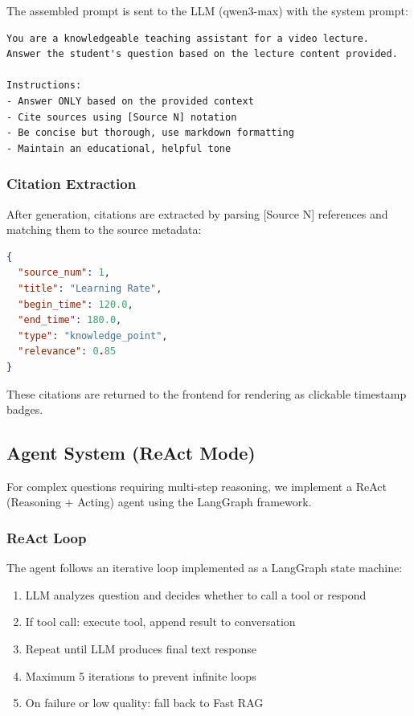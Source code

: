 The assembled prompt is sent to the LLM (qwen3-max) with the system prompt:

\begin{lstlisting}[language=text, caption={RAG System Prompt}]
You are a knowledgeable teaching assistant for a video lecture.
Answer the student's question based on the lecture content provided.

Instructions:
- Answer ONLY based on the provided context
- Cite sources using [Source N] notation
- Be concise but thorough, use markdown formatting
- Maintain an educational, helpful tone
\end{lstlisting}

\subsubsection{Citation Extraction}

After generation, citations are extracted by parsing [Source N] references and matching them to the source metadata:

\begin{lstlisting}[language=json, caption={Citation Structure}]
{
  "source_num": 1,
  "title": "Learning Rate",
  "begin_time": 120.0,
  "end_time": 180.0,
  "type": "knowledge_point",
  "relevance": 0.85
}
\end{lstlisting}

These citations are returned to the frontend for rendering as clickable timestamp badges.

\subsection{Agent System (ReAct Mode)}

For complex questions requiring multi-step reasoning, we implement a ReAct (Reasoning + Acting) agent using the LangGraph framework.

\subsubsection{ReAct Loop}

The agent follows an iterative loop implemented as a LangGraph state machine:

\begin{enumerate}
    \item LLM analyzes question and decides whether to call a tool or respond
    \item If tool call: execute tool, append result to conversation
    \item Repeat until LLM produces final text response
    \item Maximum 5 iterations to prevent infinite loops
    \item On failure or low quality: fall back to Fast RAG
\end{enumerate}

